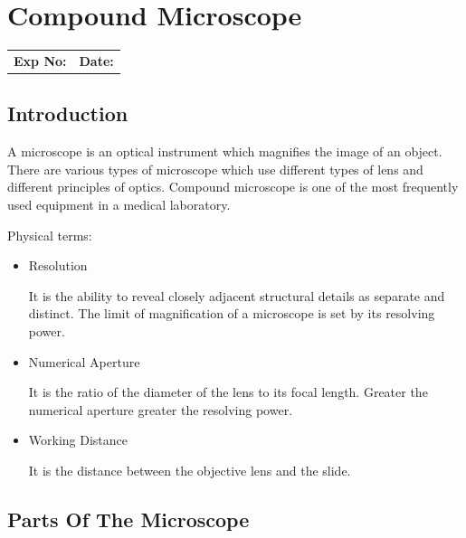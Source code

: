 \documentclass[a4paper,12pt,openany,twoside]{book}
\begin{document}
	\chapter*{\centering Compound Microscope}
	\begin{tabular}{p{4.5in} p{1in}}
		\textbf{Exp No:}  & \textbf{Date:}\\
	\end{tabular}
	\section*{Introduction}
	\par
	A microscope is an optical instrument which magnifies the image of an object.
	There are various types of microscope which use different types of lens and different principles of optics.
	Compound microscope is one of the most frequently used equipment in a medical laboratory.\newline


		Physical terms:
		\begin{itemize}
			\item{Resolution \par It is the ability to reveal closely adjacent structural details as separate and distinct. The limit of magnification of a microscope is set by its resolving power.}
			\item{Numerical Aperture \par It is the ratio of the diameter of the lens to its focal length. Greater the numerical aperture greater the resolving power.}
			\item{Working Distance \par It is the distance between the objective lens and the slide.}
		\end{itemize}

		\section*{Parts Of The Microscope}
\end{document}
